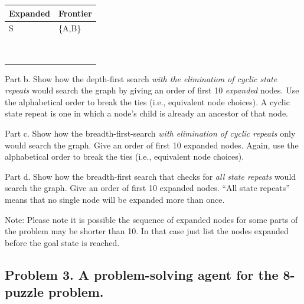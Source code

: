 \documentclass[11pt]{article}
\begin{document}
\begin{table}[h]
\begin{tabular}{|l|l|}
\hline
Expanded & Frontier \\ \hline
    S     & \{A,B\}        \\ \hline
         & \hspace{8cm}          \\ \hline
         &          \\ \hline
         &          \\ \hline
         &          \\ \hline
         &          \\ \hline
         &          \\ \hline
         &          \\ \hline
         &          \\ \hline
         &          \\ \hline
\end{tabular}
\end{table}

Part b. Show how the depth-first search \textit{with the elimination of cyclic state repeats} would search the graph by giving an order of first 10 {\em{expanded}} nodes. Use the alphabetical order to break the ties (i.e., equivalent node choices). A cyclic state repeat is one in which a node's child is already an ancestor of that node. 

\vspace{3cm}

Part c. Show how the breadth-first-search \textit{with elimination of cyclic repeats} only would search the graph. Give an order of first 10 expanded nodes.  Again, use the alphabetical order to break the ties (i.e., equivalent node choices).

\vspace{3cm}

Part d. Show how the breadth-first search that checks for \textit{all state repeats} would search the graph. Give an order of first 10 expanded nodes. ``All state repeats'' means that no single node will be expanded more than once.

Note: Please note it is possible the sequence of expanded nodes for some parts of the problem may be shorter than 10. In that case just list the nodes expanded before the goal state is reached.    

\vspace{3cm}

\subsection*{Problem 3. A problem-solving agent for the 8-puzzle problem.}
\end{document}
